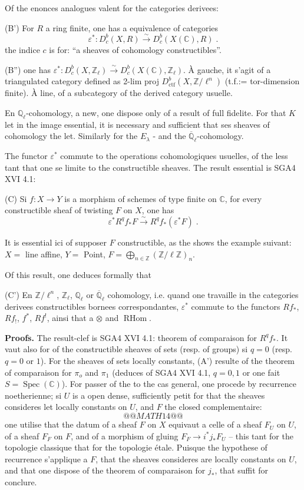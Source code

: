 \documentclass[12pt,a4paper]{article}
\theoremstyle{plain}
\theoremstyle{definition}
\theoremstyle{remark}
\DeclareMathOperator{\Spec}{Spec}
\DeclareMathOperator{\RHom}{RHom}
\newcommand{\CC}{\mathbb{C}}
\newcommand{\QQ}{\mathbb{Q}}
\newcommand{\ZZ}{\mathbb{Z}}
\begin{document}
\medskip
Of the enonces analogues valent for the categories derivees:

\medskip
(B') For $R$ a ring finite, one has a equivalence of categories
\[
\varepsilon^*: D^b_c(X, R) \xrightarrow{\sim} D^b_c(X(\CC), R)\;.
\]
the indice $c$ is for: ``a sheaves of cohomology constructibles''.

\medskip
(B'') one has $\varepsilon^*: D^b_c(X, \ZZ_{\ell}) \xrightarrow{\sim} D^b_c(X(\CC), \ZZ_{\ell})$. \`A gauche, it s'agit of a triangulated category defined as 2-lim proj $D^b_{\text{ctf}}(X, \ZZ/\ell^n)$ (t.f.:= tor-dimension finite). \`A line, of a subcategory of the derived category usuelle.

\medskip
En $\QQ_{\ell}$-cohomology, a new, one dispose only of a result of full fidelite. For that $K$ let in the image essential, it is necessary and sufficient that ses sheaves of cohomology the let. Similarly for the $E_{\lambda}$ - and the $\overline{\QQ}_{\ell}$-cohomology.

\medskip
The functor $\varepsilon^*$ commute to the operations cohomologiques usuelles, of the less tant that one se limite to the constructible sheaves. The result essential is SGA4 XVI 4.1:

\medskip
(C) Si $f: X \to Y$ is a morphism of schemes of type finite on $\CC$, for every constructible sheaf of twisting $F$ on $X$, one has
\[
\varepsilon^*R^qf_*F \xrightarrow{\sim} R^qf_{*}(\varepsilon^*F)\;.
\]

It is essential ici of supposer $F$ constructible, as the shows the example suivant: $X =$ line affine, $Y =$ Point, $F = \bigoplus_{n \in \ZZ} (\ZZ/\ell\ZZ)_n$.

Of this result, one deduces formally that

\medskip
(C') En $\ZZ/\ell^n$, $\ZZ_{\ell}$, $\QQ_{\ell}$ or $\overline{\QQ}_{\ell}$ cohomology, i.e. quand one travaille in the categories derivees constructibles bornees correspondantes, $\varepsilon^*$ commute to the functors $Rf_*$, $Rf_!$, $f^*$, $Rf^!$, ainsi that a $\otimes$ and $\RHom$.

\medskip
\noindent\textbf{Proofs.} The result-clef is SGA4 XVI 4.1: theorem of comparaison for $R^qf_*$. It vaut also for of the constructible sheaves of sets (resp. of groups) si $q = 0$ (resp. $q = 0$ or $1$). For the sheaves of sets locally constants, (A') resulte of the theorem of comparaison for $\pi_o$ and $\pi_1$ (deduces of SGA4 XVI 4.1, $q = 0, 1$ or one fait $S = \Spec(\CC)$). For passer of the to the cas general, one procede by recurrence noetherienne; si $U$ is a open dense, sufficiently petit for that the sheaves consideres let locally constants on $U$, and $F$ the closed complementaire:
\[
@@MATH14@@
\]
one utilise that the datum of a sheaf $F$ on $X$ equivaut a celle of a sheaf $F_U$ on $U$, of a sheaf $F_F$ on $F$, and of a morphism of gluing $F_F \to i^*j_*F_U$ -- this tant for the topologie classique that for the topologie étale. Puisque the hypothese of recurrence s'applique a $F$, that the sheaves consideres are locally constants on $U$, and that one dispose of the theorem of comparaison for $j_*$, that suffit for conclure.
\end{document}
